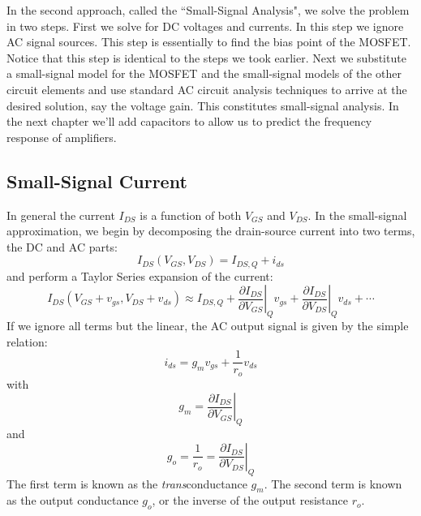 In the second approach, called the ``Small-Signal Analysis", we solve the problem in two steps.  First we solve for DC voltages and currents.  In this step we ignore AC signal sources.  This step is essentially to find the bias point of the MOSFET.  Notice that this step is identical to the steps we took earlier.  Next we substitute a small-signal model for the MOSFET and the small-signal models of the other circuit elements and use standard AC circuit analysis techniques to arrive at the desired solution, say the voltage gain. This constitutes small-signal analysis.  In the next chapter we'll add capacitors to allow us to predict the frequency response of amplifiers.
 



\subsection{Small-Signal Current}

In general the current $I_{DS}$ is a function of both $V_{GS}$ and $V_{DS}$.  In the small-signal approximation, we begin by decomposing the drain-source current into two terms, the DC and AC parts:
\begin{equation}
	I_{DS}(V_{GS},V_{DS}) = {I_{DS,Q}} + {i_{ds}}
\end{equation}
%
and perform a Taylor Series expansion of the current:
% 
\begin{equation}
I_{DS}(V_{GS} + v_{gs},V_{DS} + v_{ds}) \approx I_{DS,Q} + \left. \frac{{\partial {I_{DS}}}} {{\partial {V_{GS}}}} \right|_Q{v_{gs}} + \left. \frac{{\partial {I_{DS}}}}{{\partial {V_{DS}}}} \right|_Q {v_{ds}} + \cdots
\end{equation}
%
If we ignore all terms but the linear, the AC output signal is given by the simple relation:
\begin{equation}
	{i_{ds}} = {g_m}{v_{gs}} + \frac{1}{{{r_o}}}{v_{ds}}
\end{equation}
%
with
\begin{equation}
	g_m = \left. \frac{{\partial {I_{DS}}}} {{\partial {V_{GS}}}} \right|_Q
\end{equation}
and
\begin{equation}
	g_o = \frac{1}{r_o} = \left. \frac{{\partial {I_{DS}}}}{{\partial {V_{DS}}}} \right|_Q 
\end{equation}
The first term is known as the \textit{trans}conductance $g_m$.  The second term is known as the output conductance $g_o$, or the inverse of the output resistance $r_o$.
 

